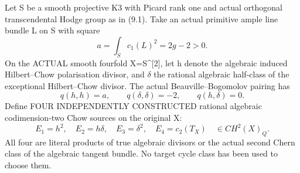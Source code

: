 \documentclass[11pt]{article}
\begin{document}
Let S be a smooth projective K3 with
Picard rank one and actual
orthogonal transcendental Hodge
group as in (9.1).
Take an actual primitive ample
line bundle L on S with square
\[
           a=\int_S c_1(L)^2
                      =2g-2>0 .
\]
On the ACTUAL smooth fourfold
X=S^[2], let h denote the
algebraic induced Hilbert--Chow
polarisation divisor, and
\(\delta\) the rational algebraic
half-class of the exceptional
Hilbert--Chow divisor. The actual
Beauville--Bogomolov pairing
has
\[
 q(h,h)=a,\qquad
 q(\delta,\delta)=-2,\qquad
 q(h,\delta)=0.                                    \tag{12.1}
\]
Define FOUR INDEPENDENTLY CONSTRUCTED
rational algebraic codimension-two
Chow sources on the original X:
\[
 \boxed{
 E_1=h^2,\quad E_2=h\delta,\quad
 E_3=\delta^2,\quad E_4=c_2(T_X)
                  \quad\in CH^2(X)_Q.}            \tag{12.2}
\]
All four are literal products of
true algebraic divisors or the
actual second Chern class of
the algebraic tangent bundle.
No target cycle class has
been used to choose them.
\end{document}

